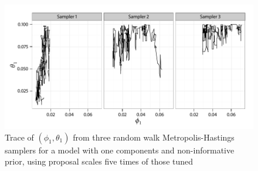 \begin{figure}
  \linespread{1.1}\selectfont
  \includegraphics[width=\linewidth]{fig_src/PET_MH_H_Path.pdf}
  \caption[Trace of parameters in the random walk algorithm for the
  \protect\pet compartmental model (uncalibrated)]
  {Trace of $(\phi_1,\theta_1)$ from three random walk
    Metropolis-Hastings samplers for a \pet model with one components and
    non-informative prior, using proposal scales five times of those tuned}
  \label{fig:pet mh untuned}
\end{figure}
